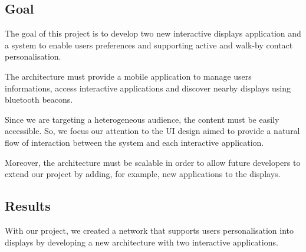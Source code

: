 \documentclass[]{usiinfbachelorproject}
\begin{document}
\begin{figure}[H]
  \centering
  \hfill
  \caption{}
\end{figure} 

\subsection{Goal}
The goal of this project is to develop two new interactive displays application and a system to enable users preferences and supporting active and walk-by contact personalisation.

The architecture must provide a mobile application to manage users informations, access interactive applications and discover nearby displays using bluetooth beacons.

Since we are targeting a heterogeneous audience, the content must be easily accessible. So, we focus our attention to the UI design aimed to provide a natural flow of interaction between the system and each interactive application.

Moreover, the architecture must be scalable in order to allow future developers to extend our project by adding, for example, new applications to the displays. 

\subsection{Results}
With our project, we created a network that supports users personalisation into displays by developing a new architecture with two interactive applications.
\end{document}

